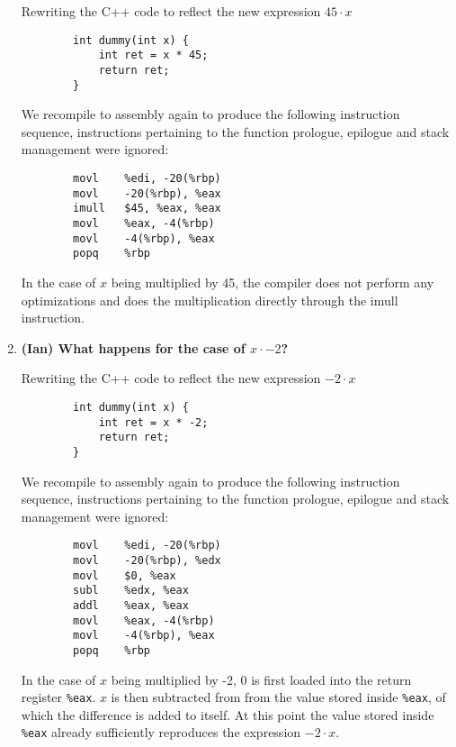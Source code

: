 \documentclass{article}
\begin{document}
\begin{enumerate}
    Rewriting the C++ code to reflect the new expression \(45 \cdot x\)

    \begin{verbatim}
        int dummy(int x) {
            int ret = x * 45;
            return ret;
        }
    \end{verbatim}

    We recompile to assembly again to produce the following instruction sequence, instructions pertaining to
    the function prologue, epilogue and stack management were ignored:

    \begin{verbatim}
        movl	%edi, -20(%rbp)
        movl	-20(%rbp), %eax
        imull	$45, %eax, %eax
        movl	%eax, -4(%rbp)
        movl	-4(%rbp), %eax
        popq	%rbp
    \end{verbatim}

    In the case of \(x\) being multiplied by 45, the compiler does not perform any optimizations and does the
    multiplication directly through the imull instruction.

    \item \textbf{(Ian) What happens for the case of \( x \cdot -2 \)?}
    
    Rewriting the C++ code to reflect the new expression \(-2 \cdot x\)

    \begin{verbatim}
        int dummy(int x) {
            int ret = x * -2;
            return ret;
        }
    \end{verbatim}

    We recompile to assembly again to produce the following instruction sequence, instructions pertaining to
    the function prologue, epilogue and stack management were ignored:

    \begin{verbatim}
        movl	%edi, -20(%rbp)
        movl	-20(%rbp), %edx
        movl	$0, %eax
        subl	%edx, %eax
        addl	%eax, %eax
        movl	%eax, -4(%rbp)
        movl	-4(%rbp), %eax
        popq	%rbp
    \end{verbatim}

    In the case of \(x\) being multiplied by -2, 0 is first loaded into the return register \texttt{\%eax}.
    \(x\) is then subtracted from from the value stored inside \texttt{\%eax}, of which the difference is added
    to itself. At this point the value stored inside \texttt{\%eax} already sufficiently reproduces the expression
    \(-2 \cdot x\). 


\end{enumerate}
\end{document}
